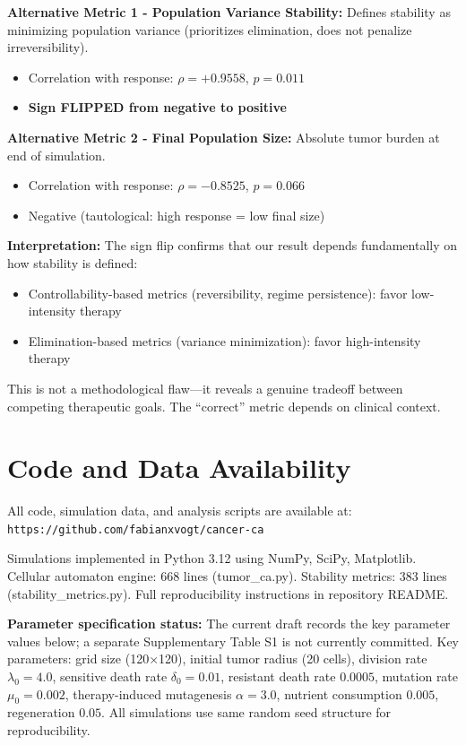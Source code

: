 \documentclass[11pt,a4paper]{article}
\begin{document}
\textbf{Alternative Metric 1 - Population Variance Stability:} Defines stability as minimizing population variance (prioritizes elimination, does not penalize irreversibility).
\begin{itemize}
    \item Correlation with response: $\rho = +0.9558$, $p = 0.011$
    \item \textbf{Sign FLIPPED from negative to positive}
\end{itemize}

\textbf{Alternative Metric 2 - Final Population Size:} Absolute tumor burden at end of simulation.
\begin{itemize}
    \item Correlation with response: $\rho = -0.8525$, $p = 0.066$
    \item Negative (tautological: high response = low final size)
\end{itemize}

\textbf{Interpretation:} The sign flip confirms that our result depends fundamentally on how stability is defined:
\begin{itemize}
    \item Controllability-based metrics (reversibility, regime persistence): favor low-intensity therapy
    \item Elimination-based metrics (variance minimization): favor high-intensity therapy
\end{itemize}

This is not a methodological flaw---it reveals a genuine tradeoff between competing therapeutic goals. The ``correct'' metric depends on clinical context.

\section*{Code and Data Availability}

All code, simulation data, and analysis scripts are available at: \\
\texttt{https://github.com/fabianxvogt/cancer-ca}

Simulations implemented in Python 3.12 using NumPy, SciPy, Matplotlib. Cellular automaton engine: 668 lines (tumor\_ca.py). Stability metrics: 383 lines (stability\_metrics.py). Full reproducibility instructions in repository README.

\textbf{Parameter specification status:} The current draft records the key parameter values below; a separate Supplementary Table S1 is not currently committed. Key parameters: grid size (120$\times$120), initial tumor radius (20 cells), division rate $\lambda_0 = 4.0$, sensitive death rate $\delta_0 = 0.01$, resistant death rate $0.0005$, mutation rate $\mu_0 = 0.002$, therapy-induced mutagenesis $\alpha = 3.0$, nutrient consumption $0.005$, regeneration $0.05$. All simulations use same random seed structure for reproducibility.
\end{document}
